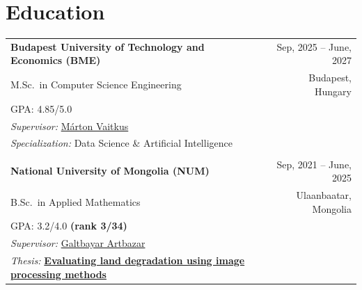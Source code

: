 \documentclass[a4paper,11pt]{article}
\newcommand{\linkicon}{{\footnotesize\faExternalLink*}}
\begin{document}


\vspace{-0.5em}
\section{Education}

\begin{tabularx}{\linewidth}{@{}l X r@{}}

\textbf{Budapest University of Technology and Economics (BME)} & & Sep, 2025 -- June, 2027\\

M.Sc.\ in Computer Science Engineering & & Budapest, Hungary \\
GPA: 4.85/5.0 \\
\textit{Supervisor:} \href{https://scholar.google.com/citations?user=Sns05HgAAAAJ\&hl=en}{M\'arton Vaitkus \linkicon} \\

\textit{Specialization:} Data Science \& Artificial Intelligence \\


& & \\



\textbf{National University of Mongolia (NUM)} & & Sep, 2021 -- June, 2025 \\

B.Sc.\ in Applied Mathematics & & Ulaanbaatar, Mongolia \\
GPA: 3.2/4.0 \textbf{(rank 3/34)}\\
\textit{Supervisor:} \href{https://scholar.google.com/citations?user=oy6Pcz4AAAAJ\&hl=en}{Galtbayar Artbazar \linkicon} \\

\textit{Thesis:} \href{https://drive.google.com/file/d/1GcDefePBMeKzups5SYEcjHAO8btNjAH7/view?usp=sharing}{\textbf{Evaluating land degradation using image processing methods \linkicon}} \\


\end{tabularx}
\end{document}
